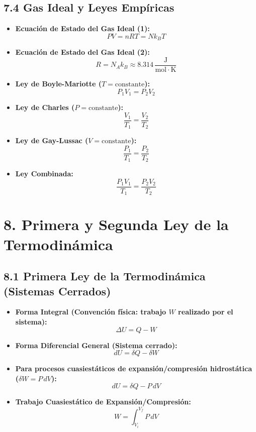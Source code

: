 \documentclass[11pt,a4paper]{article}
\begin{document}
\subsection*{7.4 Gas Ideal y Leyes Empíricas}

\begin{itemize}
  \item \textbf{Ecuación de Estado del Gas Ideal (1):}
  \[
    P V = n R T = N k_B T
  \]
  \item \textbf{Ecuación de Estado del Gas Ideal (2):}
  \[
    R = N_A k_B \approx 8.314 \, \frac{\mathrm{J}}{\mathrm{mol}\cdot\mathrm{K}}
  \]
  \item \textbf{Ley de Boyle-Mariotte ($T = \text{constante}$):}
  \[
    P_1 V_1 = P_2 V_2
  \]
  \item \textbf{Ley de Charles ($P = \text{constante}$):}
  \[
    \frac{V_1}{T_1} = \frac{V_2}{T_2}
  \]
  \item \textbf{Ley de Gay-Lussac ($V = \text{constante}$):}
  \[
    \frac{P_1}{T_1} = \frac{P_2}{T_2}
  \]
  \item \textbf{Ley Combinada:}
  \[
    \frac{P_1 V_1}{T_1} = \frac{P_2 V_2}{T_2}
  \]
\end{itemize}

\section*{8. Primera y Segunda Ley de la Termodinámica}

\subsection*{8.1 Primera Ley de la Termodinámica (Sistemas Cerrados)}

\begin{itemize}
  \item \textbf{Forma Integral (Convención física: trabajo $W$ realizado por el sistema):}
  \[
    \Delta U = Q - W
  \]
  \item \textbf{Forma Diferencial General (Sistema cerrado):}
  \[
    dU = \delta Q - \delta W
  \]
  \item \textbf{Para procesos cuasiestáticos de expansión/compresión hidrostática ($\delta W = P \, dV$):}
  \[
    dU = \delta Q - P \, dV
  \]
  \item \textbf{Trabajo Cuasiestático de Expansión/Compresión:}
  \[
    W = \int_{V_i}^{V_f} P \, dV
  \]
\end{itemize}
\end{document}
